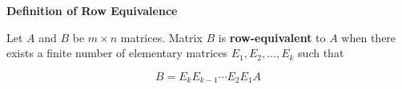 \nopagenumbers
{\bf Definition of Row Equivalence}
\vskip 1mm

\vskip 6pt
Let $A$ and $B$ be $m\times n$ matrices. Matrix $B$ is {\bf row-equivalent} to $A$ when there exists a finite number of elementary matrices $E_1,E_2,\ldots,E_k$ such that

$$B=E_kE_{k-1}\cdots E_2E_1A$$

\vfill\eject
\bye
